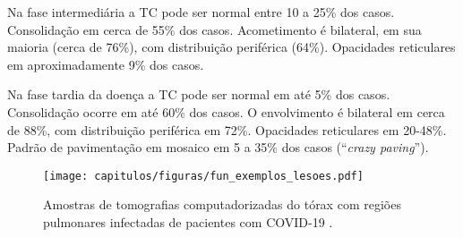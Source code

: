 Na fase intermediária a TC pode ser normal entre 10 a 25\% dos casos. Consolidação em cerca de 55\% dos casos. Acometimento é bilateral, em sua maioria (cerca de 76\%), com distribuição periférica (64\%). Opacidades reticulares em aproximadamente 9\% dos casos.

Na fase tardia da doença a TC pode ser normal em até 5\% dos casos. Consolidação ocorre em até 60\% dos casos. O envolvimento é bilateral em cerca de 88\%, com distribuição periférica em 72\%. Opacidades reticulares em 20-48\%. Padrão de pavimentação em mosaico em 5 a 35\% dos casos (“\textit{crazy paving}”).


\begin{figure}[!ht]
    \centering
    \texttt{[image: capitulos/figuras/fun\_exemplos\_lesoes.pdf]}
    \caption{Amostras de tomografias computadorizadas do tórax com regiões pulmonares infectadas de pacientes com COVID-19 \cite{Kwee2020ChestKnow}.}
    \label{fig:fun_exemplos_funcoes}
\end{figure}

